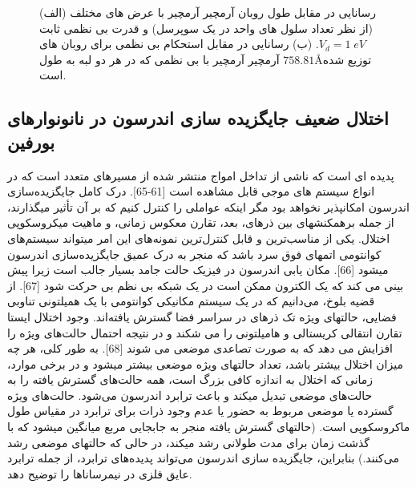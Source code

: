 \begin{figure}[!ht]
    \centering
    
    \caption{(الف) رسانایی در مقابل طول روبان آرمچیر آرمچیر با عرض های مختلف (از نظر تعداد سلول های واحد در یک سوپرسل) و قدرت بی نظمی ثابت $V_d=1\;eV$. (ب) رسانایی در مقابل استحکام بی نظمی برای روبان های آرمچیر آرمچیر با بی نظمی که در هر دو لبه به طول $758.81$\AA توزیع شده است.}
    \label{armchair-width-strangth}
  \end{figure}
  


\subsection{اختلال ضعیف جایگزیده سازی اندرسون در نانونوارهای بورفین}
پدیده ای است که ناشی از تداخل امواج منتشر شده از مسیرهای متعدد است که در انواع سیستم های موجی قابل مشاهده است [61-65]. درک کامل جایگزیده‌سازی اندرسون امکانپذیر نخواهد بود مگر اینکه عواملی را کنترل کنیم که بر آن تأثیر میگذارند، از جمله برهمکنشهای بین ذرهای، بعد، تقارن معکوس زمانی، و ماهیت میکروسکوپی اختلال. یکی از مناسب‌ترین و قابل کنترل‌ترین نمونه‌های این امر میتواند سیستم‌های کوانتومی اتمهای فوق سرد باشد که منجر به درک عمیق جایگزیده‌سازی اندرسون میشود [66]. مکان یابی اندرسون در فیزیک حالت جامد بسیار جالب است زیرا پیش بینی می کند که یک الکترون ممکن است در یک شبکه بی نظم بی حرکت شود [67]. از قضیه بلوخ، می‌دانیم که در یک سیستم مکانیکی کوانتومی با یک همیلتونی تناوبی فضایی، حالتهای ویژه تک ذرهای در سراسر فضا گسترش یافته‌اند. وجود اختلال ایستا تقارن انتقالی کریستالی و هامیلتونی را می شکند و در نتیجه احتمال حالت‌های ویژه را افزایش می دهد که به صورت تصاعدی موضعی می شوند [68]. به طور کلی، هر چه میزان اختلال بیشتر باشد، تعداد حالتهای ویژه موضعی بیشتر میشود و در برخی موارد، زمانی که اختلال به اندازه کافی بزرگ است، همه حالت‌های گسترش یافته را به حالت‌های موضعی تبدیل میکند و باعث ترابرد اندرسون می‌شود. حالت‌های ویژه گسترده یا موضعی مربوط به حضور یا عدم وجود ذرات برای ترابرد در مقیاس طول ماکروسکوپی است. (حالتهای گسترش یافته منجر به جابجایی مربع میانگین میشود که با گذشت زمان برای مدت طولانی رشد میکند، در حالی که حالتهای موضعی رشد می‌کنند.) بنابراین، جایگزیده سازی اندرسون می‌تواند پدیده‌های ترابرد، از جمله ترابرد عایق فلزی در نیمرساناها را توضیح دهد.

